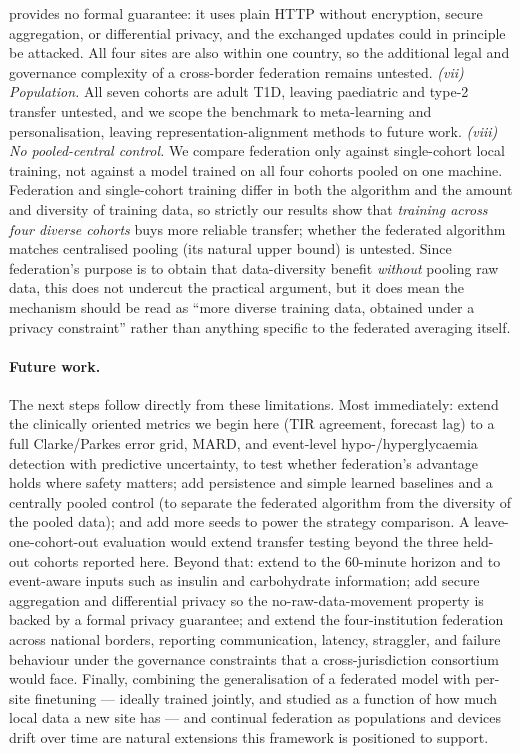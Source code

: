 \documentclass[10pt,letterpaper]{article}
\begin{document}
provides no formal guarantee: it uses plain HTTP without encryption, secure
aggregation, or differential privacy, and the exchanged updates could in principle
be attacked. All four sites are also within one country, so the additional legal
and governance complexity of a cross-border federation remains untested. \emph{(vii) Population.} All seven cohorts
are adult T1D, leaving paediatric and type-2 transfer untested, and we scope the
benchmark to meta-learning and personalisation, leaving representation-alignment
methods to future work. \emph{(viii) No pooled-central control.} We compare
federation only against single-cohort local training, not against a model trained
on all four cohorts pooled on one machine. Federation and single-cohort training
differ in both the algorithm and the amount and diversity of training data, so
strictly our results show that \emph{training across four diverse cohorts} buys
more reliable transfer; whether the federated algorithm matches centralised
pooling (its natural upper bound) is untested. Since federation's purpose is to
obtain that data-diversity benefit \emph{without} pooling raw data, this does not
undercut the practical argument, but it does mean the mechanism should be read as
``more diverse training data, obtained under a privacy constraint'' rather than
anything specific to the federated averaging itself.

\paragraph{Future work.} The next steps follow directly from these limitations.
Most immediately: extend the clinically oriented metrics we begin here (TIR
agreement, forecast lag) to a full Clarke/Parkes error grid, MARD, and event-level
hypo-/hyperglycaemia detection with predictive uncertainty, to test whether
federation's advantage holds where safety matters; add persistence and simple
learned baselines and a centrally pooled control (to separate the federated
algorithm from the diversity of the pooled data); and add more seeds to power the
strategy comparison. A leave-one-cohort-out evaluation would extend transfer
testing beyond the three held-out cohorts reported here. Beyond that: extend to the
60-minute horizon and to event-aware inputs such as insulin and carbohydrate
information; add secure aggregation and differential privacy so the
no-raw-data-movement property is backed by a formal privacy guarantee; and extend
the four-institution federation across national borders, reporting communication,
latency, straggler, and failure behaviour under the governance constraints that a
cross-jurisdiction consortium would face. Finally, combining the
generalisation of a federated model with per-site finetuning --- ideally trained
jointly, and studied as a function of how much local data a new site has --- and
continual federation as populations and devices drift over time are natural
extensions this framework is positioned to support.



\end{document}
